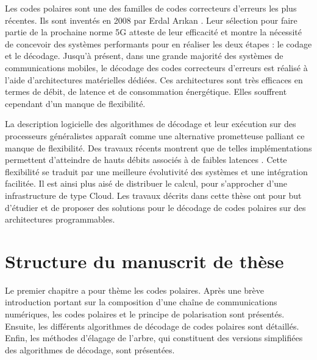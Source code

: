 Les codes polaires sont une des familles de codes correcteurs d'erreurs les plus récentes. Ils sont inventés en 2008 par Erdal Ar{\i}kan \cite{arikan_channel_2009}. Leur sélection pour faire partie de la prochaine norme 5G atteste de leur efficacité et montre la nécessité de concevoir des systèmes performants pour en réaliser les deux étapes : le codage et le décodage. Jusqu'à présent, dans une grande majorité des systèmes de communications mobiles, le décodage des codes correcteurs d'erreurs est réalisé à l'aide d'architectures matérielles dédiées. Ces architectures sont très efficaces en termes de débit, de latence et de consommation énergétique. Elles souffrent cependant d'un manque de flexibilité.


La description logicielle des algorithmes de décodage et leur exécution sur des processeurs généralistes apparaît comme une alternative prometteuse palliant ce manque de flexibilité. Des travaux récents montrent que de telles implémentations permettent d'atteindre de hauts débits associés à de faibles latences \cite{sarkis_fast_2014,giard_fast_2014}. Cette flexibilité se traduit par une meilleure évolutivité des systèmes et une intégration facilitée. Il est ainsi plus aisé de distribuer le calcul, pour s'approcher d'une infrastructure de type Cloud. Les travaux décrits dans cette thèse ont pour but d'étudier et de proposer des solutions pour le décodage de codes polaires sur des architectures programmables.

\section*{Structure du manuscrit de thèse}

Le premier chapitre a pour thème les codes polaires. Après une brève introduction portant sur la composition d'une chaîne de communications numériques, les codes polaires et le principe de polarisation sont présentés. Ensuite, les différents algorithmes de décodage de codes polaires sont détaillés. Enfin, les méthodes d'élagage de l'arbre, qui constituent des versions simplifiées des algorithmes de décodage, sont présentées.

